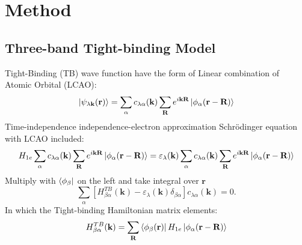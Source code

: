 \documentclass{beamer}
\begin{document}
	\section{Method}
	\subsection{Three-band Tight-binding Model}
	\begin{frame}
		Tight-Binding (TB) wave function have the form of Linear combination of Atomic Orbital (LCAO):
		\begin{equation}
			\ket{\psi_{\lambda \textbf{k}}(\textbf{r})} = \sum_{\alpha} c_{\lambda \alpha} (\textbf{k}) \sum_{\textbf{R}} e^{i\textbf{k}\textbf{R}} \ket{\phi_{\alpha}(\textbf{r}-\textbf{R})}
		\end{equation}
		Time-independence independence-electron approximation Schrödinger equation with LCAO included:
		\begin{equation*}
			H_{1e} \sum_{\alpha} c_{\lambda \alpha} (\textbf{k}) \sum_{\textbf{R}} e^{i\textbf{k}\textbf{R}} \ket{\phi_{\alpha}(\textbf{r}-\textbf{R})} = \varepsilon_{\lambda} (\textbf{k}) \sum_{\alpha} c_{\lambda \alpha} (\textbf{k}) \sum_{\textbf{R}} e^{i\textbf{k}\textbf{R}} \ket{\phi_{\alpha}(\textbf{r}-\textbf{R})}
		\end{equation*}
		Multiply with $\bra{\phi_{\beta}}$ on the left and take integral over $\textbf{r}$
		\begin{equation}
			\sum_{\alpha} [H^{TB}_{\beta \alpha}(\textbf{k}) - \varepsilon_{\lambda}(\textbf{k})\delta_{\beta\alpha}]c_{\lambda \alpha}(\textbf{k}) = 0.
		\end{equation}
		In which the Tight-binding Hamiltonian matrix elements:
		\begin{equation}
			H^{TB}_{\beta \alpha}(\textbf{k}) = \sum_{\textbf{R}} \bra{\phi_{\beta} (\textbf{r})} H_{1e}\ket{\phi_{\alpha}(\textbf{r}-\textbf{R})}
		\end{equation}
	\end{frame}
\end{document}
